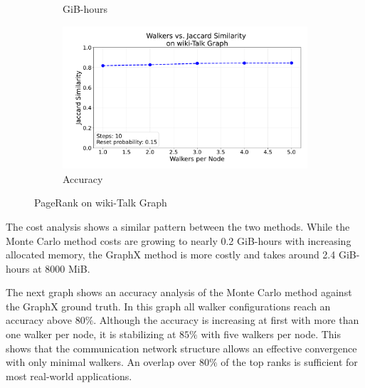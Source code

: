 \begin{figure}[H]
\begin{subfigure}[t]{0.5\linewidth}
        \caption{GiB-hours}
        \label{fig:wikigibhrs}
    \end{subfigure}
    \begin{subfigure}[t]{0.5\linewidth}
        \centering
        \includegraphics[width=\linewidth]{images/plots/wiki-Talk/accuracy_plots_wiki_talk.pdf}
        \caption{Accuracy}
        \label{fig:wikigibhrs}
    \end{subfigure}
    \caption{PageRank on wiki-Talk Graph}
    \label{fig:wiki-comparison}
\end{figure}


The cost analysis shows a similar pattern between the two methods. While the Monte Carlo method costs are growing to nearly 0.2 GiB-hours with increasing allocated memory, the GraphX method is more costly and takes around 2.4 GiB-hours at 8000 MiB. \par
The next graph shows an accuracy analysis of the Monte Carlo method against the GraphX ground truth. In this graph all walker configurations reach an accuracy above $80\%$. Although the accuracy is increasing at first with more than one walker per node, it is stabilizing at $85\%$ with five walkers per node. This shows that the communication network structure allows an effective convergence with only minimal walkers. An overlap over $80\%$ of the top ranks is sufficient for most real-world applications. \par



